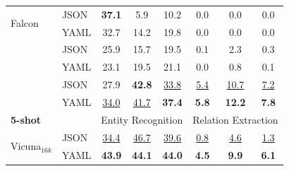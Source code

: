 \begin{table}[tb]
\begin{tabular}{ll|ccc|ccc}
    \multirow{2}{*}{Falcon} &
    JSON & \textbf{37.1} & 5.9 & 10.2
              & 0.0 & 0.0 & 0.0 \\
    \ & YAML & 32.7 & 14.2 &
    \hphantom{${}_{\Delta\text{+9.6}}$}
    19.8{\color{parametergreen}{${}_{\Delta\text{+9.6}}$}}
              & 0.0 & 0.0 &
    \hphantom{${}_{\Delta\text{+0.0}}$}
    0.0{\color{contextgrey}{${}_{\Delta\text{+0.0}}$}}  \\
    \arrayrulecolor{lightgrey}\cline{1-2}\arrayrulecolor{black}

    \multirow{2}{*}{GALACTICA} &
    JSON & 25.9 & 15.7 & 19.5
              & 0.1 & 2.3 & 0.3 \\
    \ & YAML & 23.1 & 19.5 &
    \hphantom{${}_{\Delta\text{+1.6}}$}
    21.1{\color{parametergreen}{${}_{\Delta\text{+1.6}}$}}
              & 0.0 & 0.8 &
    \hphantom{${}_{\Delta\text{-0.2}}$}
    0.1{\color{valuered}{${}_{\Delta\text{-0.2}}$}}  \\
    \arrayrulecolor{lightgrey}\cline{1-2}\arrayrulecolor{black}

    \multirow{2}{*}{GPT-3.5} &
    JSON & 27.9 & \textbf{42.8} & \underline{33.8}
              & \underline{5.4} & \underline{10.7} & \underline{7.2} \\
    \ & YAML & \underline{34.0} & \underline{41.7} &
    \hphantom{${}_{\Delta\text{+3.6}}$}
    \textbf{37.4}{\color{parametergreen}{${}_{\Delta\text{+3.6}}$}}
              & \textbf{5.8} & \textbf{12.2} &
    \hphantom{${}_{\Delta\text{+0.6}}$}
    \textbf{7.8}{\color{parametergreen}{${}_{\Delta\text{+0.6}}$}}  \\

  \hline
    \multicolumn{2}{l|}{\textbf{5-shot}} &
    \multicolumn{3}{c|}{Entity Recognition} &
    \multicolumn{3}{c}{Relation Extraction} \\
  \hline

    \multirow{2}{*}{Vicuna${}_{16k}$} &
    JSON & \underline{34.4} & \underline{46.7} & \underline{39.6}
              & \underline{0.8} & \underline{4.6} & \underline{1.3} \\
    \ & YAML & \textbf{43.9} & \textbf{44.1} &
    \hphantom{${}_{\Delta\text{+0.4}}$}
    \textbf{44.0}{\color{parametergreen}{${}_{\Delta\text{+0.4}}$}}
              & \textbf{4.5} & \textbf{9.9} &
    \hphantom{${}_{\Delta\text{+4.8}}$}
    \textbf{6.1}{\color{parametergreen}{${}_{\Delta\text{+4.8}}$}}  \\
  \hline
  \end{tabular}
\end{table}

